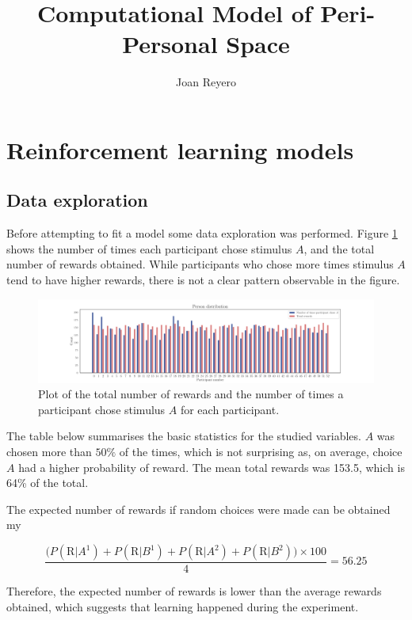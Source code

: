 \documentclass[12pt]{article}
\title{Computational Model of Peri-Personal Space}
\author{Joan Reyero}
\begin{document}
\maketitle

\section{Reinforcement learning models}

\subsection{Data exploration}

Before attempting to fit a model some data exploration was performed. Figure \ref{fig:2.1} shows the number of times each participant chose stimulus $A$, and the total number of rewards obtained. While participants who chose more times stimulus $A$ tend to have higher rewards, there is not a clear pattern observable in the figure. 

\begin{figure}[h!]
	\centering
	\hspace*{-0.6in}
	\includegraphics[width=1.2\linewidth]{figures/2.1.pdf}
	\caption{Plot of the total number of rewards and the number of times a participant chose stimulus $A$ for each participant.}
	\label{fig:2.1}
\end{figure}

The table below summarises the basic statistics for the studied variables. $A$ was chosen more than $50\%$ of the times, which is not surprising as, on average, choice $A$ had a higher probability of reward. The mean total rewards was 153.5, which is 64\% of the total.

The expected number of rewards if random choices were made can be obtained my

\[ \frac{\big(P(\mathrm{R} | A^1) + P(\mathrm{R} | B^1) + P(\mathrm{R} | A^2) + P(\mathrm{R} | B^2)\big) \times 100}{4} = 56.25 \]

Therefore, the expected number of rewards is lower than the average rewards obtained, which suggests that learning happened during the experiment.
\end{document}
